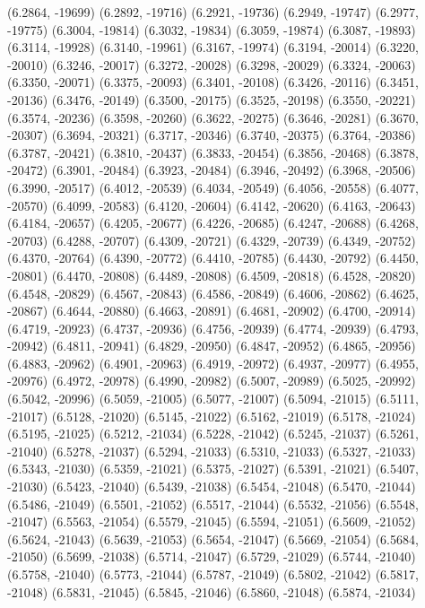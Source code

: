 {(6.2864,	-19699)
(6.2892,	-19716)
(6.2921,	-19736)
(6.2949,	-19747)
(6.2977,	-19775)
(6.3004,	-19814)
(6.3032,	-19834)
(6.3059,	-19874)
(6.3087,	-19893)
(6.3114,	-19928)
(6.3140,	-19961)
(6.3167,	-19974)
(6.3194,	-20014)
(6.3220,	-20010)
(6.3246,	-20017)
(6.3272,	-20028)
(6.3298,	-20029)
(6.3324,	-20063)
(6.3350,	-20071)
(6.3375,	-20093)
(6.3401,	-20108)
(6.3426,	-20116)
(6.3451,	-20136)
(6.3476,	-20149)
(6.3500,	-20175)
(6.3525,	-20198)
(6.3550,	-20221)
(6.3574,	-20236)
(6.3598,	-20260)
(6.3622,	-20275)
(6.3646,	-20281)
(6.3670,	-20307)
(6.3694,	-20321)
(6.3717,	-20346)
(6.3740,	-20375)
(6.3764,	-20386)
(6.3787,	-20421)
(6.3810,	-20437)
(6.3833,	-20454)
(6.3856,	-20468)
(6.3878,	-20472)
(6.3901,	-20484)
(6.3923,	-20484)
(6.3946,	-20492)
(6.3968,	-20506)
(6.3990,	-20517)
(6.4012,	-20539)
(6.4034,	-20549)
(6.4056,	-20558)
(6.4077,	-20570)
(6.4099,	-20583)
(6.4120,	-20604)
(6.4142,	-20620)
(6.4163,	-20643)
(6.4184,	-20657)
(6.4205,	-20677)
(6.4226,	-20685)
(6.4247,	-20688)
(6.4268,	-20703)
(6.4288,	-20707)
(6.4309,	-20721)
(6.4329,	-20739)
(6.4349,	-20752)
(6.4370,	-20764)
(6.4390,	-20772)
(6.4410,	-20785)
(6.4430,	-20792)
(6.4450,	-20801)
(6.4470,	-20808)
(6.4489,	-20808)
(6.4509,	-20818)
(6.4528,	-20820)
(6.4548,	-20829)
(6.4567,	-20843)
(6.4586,	-20849)
(6.4606,	-20862)
(6.4625,	-20867)
(6.4644,	-20880)
(6.4663,	-20891)
(6.4681,	-20902)
(6.4700,	-20914)
(6.4719,	-20923)
(6.4737,	-20936)
(6.4756,	-20939)
(6.4774,	-20939)
(6.4793,	-20942)
(6.4811,	-20941)
(6.4829,	-20950)
(6.4847,	-20952)
(6.4865,	-20956)
(6.4883,	-20962)
(6.4901,	-20963)
(6.4919,	-20972)
(6.4937,	-20977)
(6.4955,	-20976)
(6.4972,	-20978)
(6.4990,	-20982)
(6.5007,	-20989)
(6.5025,	-20992)
(6.5042,	-20996)
(6.5059,	-21005)
(6.5077,	-21007)
(6.5094,	-21015)
(6.5111,	-21017)
(6.5128,	-21020)
(6.5145,	-21022)
(6.5162,	-21019)
(6.5178,	-21024)
(6.5195,	-21025)
(6.5212,	-21034)
(6.5228,	-21042)
(6.5245,	-21037)
(6.5261,	-21040)
(6.5278,	-21037)
(6.5294,	-21033)
(6.5310,	-21033)
(6.5327,	-21033)
(6.5343,	-21030)
(6.5359,	-21021)
(6.5375,	-21027)
(6.5391,	-21021)
(6.5407,	-21030)
(6.5423,	-21040)
(6.5439,	-21038)
(6.5454,	-21048)
(6.5470,	-21044)
(6.5486,	-21049)
(6.5501,	-21052)
(6.5517,	-21044)
(6.5532,	-21056)
(6.5548,	-21047)
(6.5563,	-21054)
(6.5579,	-21045)
(6.5594,	-21051)
(6.5609,	-21052)
(6.5624,	-21043)
(6.5639,	-21053)
(6.5654,	-21047)
(6.5669,	-21054)
(6.5684,	-21050)
(6.5699,	-21038)
(6.5714,	-21047)
(6.5729,	-21029)
(6.5744,	-21040)
(6.5758,	-21040)
(6.5773,	-21044)
(6.5787,	-21049)
(6.5802,	-21042)
(6.5817,	-21048)
(6.5831,	-21045)
(6.5845,	-21046)
(6.5860,	-21048)
(6.5874,	-21034)
}
